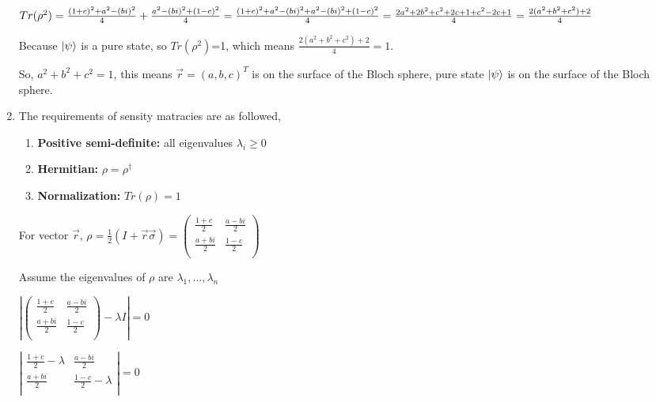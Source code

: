 \documentclass{article}
\begin{document}
\begin{enumerate}
          $Tr(\rho^2)
              \\=\frac{(1+c)^2+a^2-(bi)^2}{4}+\frac{a^2-(bi)^2+(1-c)^2}{4}
              \\=\frac{(1+c)^2+a^2-(bi)^2+a^2-(bi)^2+(1-c)^2}{4}
              \\=\frac{2a^2+2b^2+c^2+2c+1+c^2-2c+1}{4}
              \\=\frac{2(a^2+b^2+c^2)+2}{4}
          $

          Because $\ket{\psi}$ is a pure state, so $Tr(\rho^2)$=1, which means $\frac{2(a^2+b^2+c^2)+2}{4}=1$.

          So, $a^2+b^2+c^2=1$, this means $\vec{r}=(a,b,c)^T$ is on the surface of the Bloch sphere, pure state $\ket{\psi}$ is on the surface of the Bloch sphere.



    \item The requirements of sensity matracies are as followed,
          \begin{enumerate}
              \item \textbf{Positive semi-definite:} all eigenvalues $\lambda_i\geq0$
              \item \textbf{Hermitian:} $\rho=\rho^{\dag}$
              \item \textbf{Normalization:} $Tr(\rho)=1$
          \end{enumerate}


          For vector $\vec{r}$, $\rho=\frac{1}{2}(I+\vec{r}\vec{\sigma})=\left(
              \begin{array}{cc}
                      \frac{1+c}{2} & \frac{a-bi}{2} \\\frac{a+bi}{2}&\frac{1-c}{2}\\
                  \end{array}
              \right)$

          Assume the eigenvalues of $\rho$ are $\lambda_1,...,\lambda_n$

          $\left|
              \left(
              \begin{array}{cc}
                      \frac{1+c}{2} & \frac{a-bi}{2} \\\frac{a+bi}{2}&\frac{1-c}{2}\\
                  \end{array}
              \right)-\lambda I\right|=0$

          $\left|
              \begin{array}{cc}
                  \frac{1+c}{2}-\lambda & \frac{a-bi}{2} \\\frac{a+bi}{2}&\frac{1-c}{2}-\lambda\\
              \end{array}
              \right|=0$


\end{enumerate}
\end{document}
